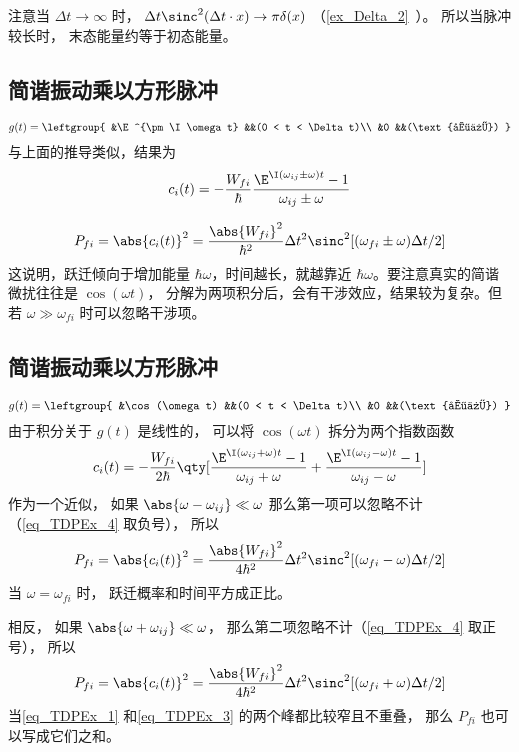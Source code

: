 注意当 $\Delta t \to \infty$ 时， $\Delta t\sinc^2(\Delta t\cdot x) \to \pi\delta(x)$ （\autoref{ex_Delta_2}~）。 所以当脉冲较长时， 末态能量约等于初态能量。

\subsection{简谐振动乘以方形脉冲}
\begin{equation}
g(t) = \leftgroup{
&\E^{\pm\I\omega t} &&(0 < t < \Delta t)\\
&0 &&(\text{其他})
}\end{equation}
与上面的推导类似，结果为
\begin{equation}\label{eq_TDPEx_4}
c_i(t) = -\frac{W_{fi}}{\hbar} \frac{\E^{\I(\omega_{ij} \pm \omega)t} - 1}{\omega_{ij} \pm \omega}
\end{equation}

\begin{equation}
P_{fi} = \abs{c_i(t)}^2 = \frac{\abs{W_{fi}}^2}{\hbar^2} \Delta t^2 \sinc^2[(\omega_{fi}\pm\omega)\Delta t/2]
\end{equation}
这说明，跃迁倾向于增加能量 $\hbar\omega$，时间越长，就越靠近 $\hbar\omega$。要注意真实的简谐微扰往往是 $\cos(\omega t)$， 分解为两项积分后，会有干涉效应，结果较为复杂。但若 $\omega \gg \omega_{fi}$ 时可以忽略干涉项。

\subsection{简谐振动乘以方形脉冲}
\begin{equation}
g(t) = \leftgroup{
&\cos(\omega t) &&(0 < t < \Delta t)\\
&0 &&(\text{其他})
}\end{equation}
由于积分关于 $g(t)$ 是线性的， 可以将 $\cos(\omega t)$ 拆分为两个指数函数
\begin{equation}
c_i(t) = -\frac{W_{fi}}{2\hbar} \qty[\frac{\E^{\I(\omega_{ij} + \omega)t} - 1}{\omega_{ij} + \omega} + \frac{\E^{\I(\omega_{ij} - \omega)t} - 1}{\omega_{ij} - \omega}]
\end{equation}
作为一个近似， 如果 $\abs{\omega - \omega_{ij}} \ll \omega$ 那么第一项可以忽略不计（\autoref{eq_TDPEx_4} 取负号）， 所以
\begin{equation}\label{eq_TDPEx_1}
P_{fi} = \abs{c_i(t)}^2 = \frac{\abs{W_{fi}}^2}{4\hbar^2} \Delta t^2 \sinc^2[(\omega_{fi}-\omega)\Delta t/2]
\end{equation}
当 $\omega = \omega_{fi}$ 时， 跃迁概率和时间平方成正比。

相反， 如果 $\abs{\omega + \omega_{ij}} \ll \omega$， 那么第二项忽略不计（\autoref{eq_TDPEx_4} 取正号）， 所以
\begin{equation}\label{eq_TDPEx_3}
P_{fi} = \abs{c_i(t)}^2 = \frac{\abs{W_{fi}}^2}{4\hbar^2} \Delta t^2 \sinc^2[(\omega_{fi}+\omega)\Delta t/2]
\end{equation}
当\autoref{eq_TDPEx_1} 和\autoref{eq_TDPEx_3} 的两个峰都比较窄且不重叠， 那么 $P_{fi}$ 也可以写成它们之和。
